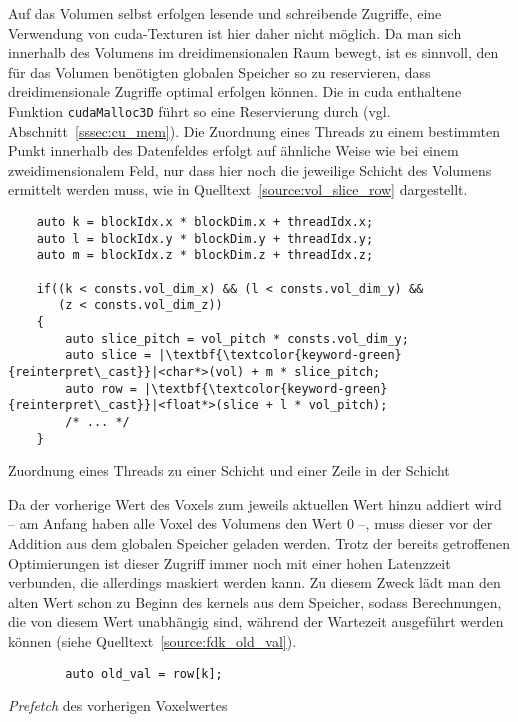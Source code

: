 Auf das Volumen selbst erfolgen lesende und schreibende Zugriffe, eine Verwendung von \gls{cuda}-Texturen ist hier daher
nicht möglich. Da man sich innerhalb des Volumens im dreidimensionalen Raum bewegt, ist es sinnvoll, den für das Volumen
benötigten globalen Speicher so zu reservieren, dass dreidimensionale Zugriffe optimal erfolgen können. Die in
\gls{cuda} enthaltene Funktion \texttt{cudaMalloc3D} führt so eine Reservierung durch (vgl.
Abschnitt~\ref{sssec:cu_mem}). Die Zuordnung eines Threads zu einem bestimmten Punkt innerhalb des Datenfeldes erfolgt
auf ähnliche Weise wie bei einem zweidimensionalem Feld, nur dass hier noch die jeweilige Schicht des Volumens ermittelt
werden muss, wie in Quelltext~\ref{source:vol_slice_row} dargestellt.

\begin{code}
\begin{verbatim}
    auto k = blockIdx.x * blockDim.x + threadIdx.x;
    auto l = blockIdx.y * blockDim.y + threadIdx.y;
    auto m = blockIdx.z * blockDim.z + threadIdx.z;

    if((k < consts.vol_dim_x) && (l < consts.vol_dim_y) &&
       (z < consts.vol_dim_z))
    {
        auto slice_pitch = vol_pitch * consts.vol_dim_y;
        auto slice = |\textbf{\textcolor{keyword-green}{reinterpret\_cast}}|<char*>(vol) + m * slice_pitch;
        auto row = |\textbf{\textcolor{keyword-green}{reinterpret\_cast}}|<float*>(slice + l * vol_pitch);
        /* ... */
    }    
\end{verbatim}
\caption{Zuordnung eines Threads zu einer Schicht und einer Zeile in der Schicht}
\label{source:vol_slice_row}
\end{code}

Da der vorherige Wert des Voxels zum jeweils aktuellen Wert hinzu addiert wird -- am Anfang haben alle Voxel des
Volumens den Wert 0 --, muss dieser vor der Addition aus dem globalen Speicher geladen werden. Trotz der bereits
getroffenen Optimierungen ist dieser Zugriff immer noch mit einer hohen Latenzzeit verbunden, die allerdings maskiert
werden kann. Zu diesem Zweck lädt man den alten Wert schon zu Beginn des \gls{kernel}s aus dem Speicher, sodass
Berechnungen, die von diesem Wert unabhängig sind, während der Wartezeit ausgeführt werden können (siehe
Quelltext~\ref{source:fdk_old_val}).

\begin{code}
\begin{verbatim}
        auto old_val = row[k];
\end{verbatim}
\caption{\textit{Prefetch} des vorherigen Voxelwertes}
\label{source:fdk_old_val}
\end{code}

